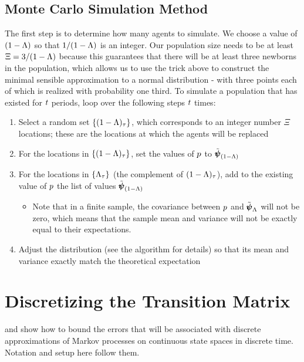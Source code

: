 \documentclass[\econtexRoot/BufferStockTheory.tex]{subfiles}
\begin{document}
\subsection{Monte Carlo Simulation Method}
The first step is to determine how many agents to simulate.
\newcommand{\popMult}{\Xi}
We choose a value of $(1-\Lambda)$ so that $1/(1-\Lambda)$ is an integer.  Our population size needs to be at least $\popMult = 3/\Die$ because this guarantees that there will be at least three newborns in the population, which allows us to use the trick above to construct the minimal sensible approximation to a normal distribution - with three points each of which is realized with probability one third.
To simulate a population that has existed for $t$ periods, loop over the following steps $t$ times:
\begin{enumerate}
\item Select a random set $\{(1-\Lambda)_{\tau}\}$, which corresponds to an integer number $\popMult$ locations; these are the locations at which the agents will be replaced 
\item For the locations in $\{(1-\Lambda)_{\tau}\}$, set the values of $p$ to $\tilde{\pmb{\psi}}_{(1-\Lambda)}$
\item For the locations in $\{\Lambda_{\tau}\}$ (the complement of $(1-\Lambda)_{\tau}$), add to the existing value of $p$ the list of values $\tilde{\pmb{\psi}}_{(1-\Lambda)}$
  \begin{itemize}
  \item Note that in a finite sample, the covariance between $p$ and $\tilde{\pmb{\psi}}_{\Lambda}$ will not be zero, which means that the sample mean and variance will not be exactly equal to their expectations.
  \end{itemize}
\item Adjust the distribution (see the algorithm for details) so that its mean and variance exactly match the theoretical expectation    
\end{enumerate}
\section{Discretizing the Transition Matrix}
\cite{saDiscrete} and \cite{saQuantitative} show how to bound the errors that will be associated with discrete approximations of Markov processes on continuous state spaces in discrete time.  Notation and setup here follow them.
\end{document}
